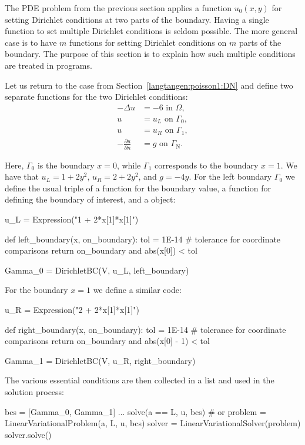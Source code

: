 The PDE problem from the previous section applies a function $u_0(x,y)$
for setting Dirichlet conditions at two parts of the boundary.
Having a single function to set multiple Dirichlet conditions is seldom
possible. The more general case is to have $m$ functions for setting
Dirichlet conditions on $m$ parts of the boundary. The purpose of this
section is to explain how such multiple conditions are treated in \fenics{}
programs.

Let us return to the case from Section~\ref{langtangen:poisson1:DN}
and define two separate functions for the two Dirichlet conditions:
\begin{align}
  - \Delta u &= -6 \mbox{ in } \Omega,
\\
  u &= u_L \mbox{ on } \Gamma_0,
\\
  u &= u_R \mbox{ on } \Gamma_1,
\\
  - \frac{\partial u}{\partial n} &= g \mbox{ on } \Gamma_{\mathrm{N}}.
\end{align}

\clearpage

\noindent
Here, $\Gamma_0$ is the boundary $x=0$, while $\Gamma_1$ corresponds to
the boundary $x=1$.  We have that $u_L = 1 + 2y^2$, $u_R = 2 + 2y^2$,
and $g=-4y$.  For the left boundary $\Gamma_0$ we define the usual
triple of a function for the boundary value, a function for defining
the boundary of interest, and a  object:
\begin{python}
u_L = Expression("1 + 2*x[1]*x[1]")

def left_boundary(x, on_boundary):
    tol = 1E-14   # tolerance for coordinate comparisons
    return on_boundary and abs(x[0]) < tol

Gamma_0 = DirichletBC(V, u_L, left_boundary)
\end{python}

For the boundary $x=1$ we define a similar code:
\begin{python}
u_R = Expression("2 + 2*x[1]*x[1]")

def right_boundary(x, on_boundary):
    tol = 1E-14   # tolerance for coordinate comparisons
    return on_boundary and abs(x[0] - 1) < tol

Gamma_1 = DirichletBC(V, u_R, right_boundary)
\end{python}
The various essential conditions are then collected in a list
and used in the solution process:
\begin{python}
bcs = [Gamma_0, Gamma_1]
...
solve(a == L, u, bcs)
# or
problem = LinearVariationalProblem(a, L, u, bcs)
solver  = LinearVariationalSolver(problem)
solver.solve()
\end{python}

